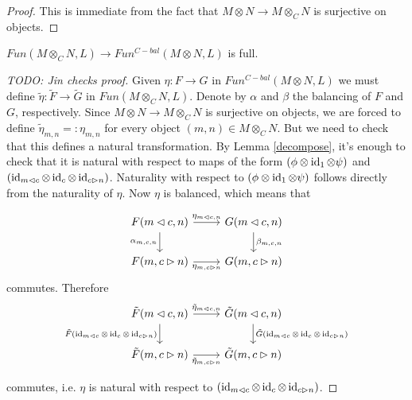 \begin{proof}
  This is immediate from the fact that $M\otimes N \to M\otimes_C N$ is
  surjective on objects.
\end{proof}

\begin{lemma}\label{full}
  $Fun(M\otimes_C N,L)\to Fun^{C-bal}(M\otimes N,L)$ is full.
\end{lemma}

\begin{proof}
  [TODO: Jin checks proof]

  Given $\eta:F\to G$ in $Fun^{C-bal}(M\otimes N,L)$ we must define
  $\tilde{\eta}:\tilde{F}\to\tilde{G}$ in $Fun(M\otimes_C N,L)$. Denote by
  $\alpha$ and $\beta$ the balancing of $F$ and $G$, respectively. Since
  $M\otimes N\to M\otimes_C N$ is surjective on objects, we are forced to
  define $\tilde{\eta}_{m,n}=:\eta_{m,n}$ for every object $(m,n)\in
  M\otimes_C N$. But we need to check that this defines a natural
  transformation. By Lemma \ref{decompose}, it's enough to check that it is
  natural with respect to maps of the form $(\phi\otimes\operatorname{id}_1\otimes\psi)$ and
  $(\operatorname{id}_{m\lhd c}\otimes\operatorname{id}_c\otimes\operatorname{id}_{c\rhd n})$. Naturality with respect
  to $(\phi\otimes\operatorname{id}_1\otimes\psi)$ follows directly from the naturality of
  $\eta$. Now $\eta$ is balanced, which means that

  \[
    \begin{tikzcd}
      {F(m\lhd c, n)} & {G(m\lhd c, n)} \\
      {F(m,c\rhd n)} & {G(m,c\rhd n)}
      \arrow["{\eta_{m\lhd c, n}}", from=1-1, to=1-2]
      \arrow["{\alpha_{m,c,n}}"', from=1-1, to=2-1]
      \arrow["{\beta_{m,c,n}}", from=1-2, to=2-2]
      \arrow["{\eta_{m,c\rhd n}}"', from=2-1, to=2-2]
    \end{tikzcd}\]
  commutes. Therefore
  \[
    \begin{tikzcd}
      {\tilde{F}(m\lhd c, n)} & {\tilde{G}(m\lhd c, n)} \\
      {\tilde{F}(m,c\rhd n)} & {\tilde{G}(m,c\rhd n)}
      \arrow["{\tilde{\eta}_{m\lhd c, n}}", from=1-1, to=1-2]
      \arrow["{\tilde{F}(\id_{m\lhd c}\otimes\id_c\otimes\id_{c\rhd n})}"', from=1-1, to=2-1]
      \arrow["{\tilde{G}(\id_{m\lhd c}\otimes\id_c\otimes\id_{c\rhd n})}", from=1-2, to=2-2]
      \arrow["{\tilde{\eta}_{m,c\rhd n}}"', from=2-1, to=2-2]
    \end{tikzcd}
  \]

  commutes, i.e. $\eta$ is natural with respect to $(\operatorname{id}_{m\lhd
  c}\otimes\operatorname{id}_c\otimes\operatorname{id}_{c\rhd n})$.
\end{proof}

